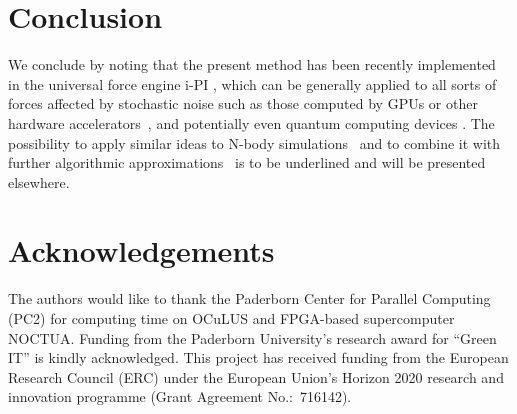 \documentclass[preprint]{elsarticle}
\begin{document}
\section{Conclusion}
\label{sec:conclusion}
We conclude by noting that the present method has been recently implemented in the universal force engine i-PI \cite{iPi}, which can be generally applied to all sorts of forces affected by stochastic noise such as those computed by GPUs or other hardware accelerators~\cite{HOOMD, NAMD, OpenMM, HalMD, Lammps, Amber, Gromacs}, and potentially even quantum computing devices \cite{Steane, Knill, Blatt, Chow}. The possibility to apply similar ideas to N-body simulations~\cite{White, Makino} and to combine it with further algorithmic approximations~\cite{LassAC} is to be underlined and will be presented elsewhere.

\section*{Acknowledgements}
The authors would like to thank the Paderborn Center for Parallel Computing (PC2) for computing time on OCuLUS and FPGA-based supercomputer NOCTUA. Funding from the Paderborn University's research award for ``Green IT'' is kindly acknowledged. This project has received funding from the European Research Council (ERC) under the European Union's Horizon 2020 research and innovation programme (Grant Agreement No.:~716142).
\end{document}
